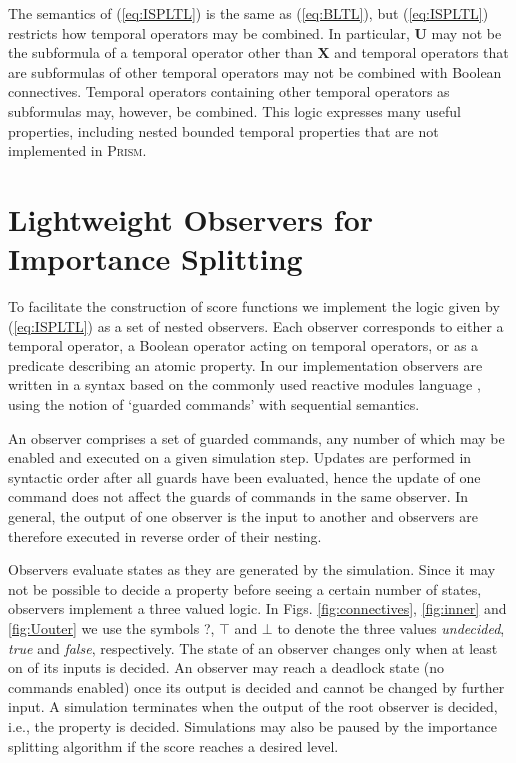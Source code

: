 \documentclass{llncs}
\begin{document}
The semantics of (\ref{eq:ISPLTL}) is the same as (\ref{eq:BLTL}),
but (\ref{eq:ISPLTL}) restricts how temporal operators may be combined.
In particular, $\mathbf{U}$ may not be the subformula of a temporal
operator other than $\mathbf{X}$ and temporal operators that are
subformulas of other temporal operators may not be combined with Boolean
connectives. Temporal operators containing other temporal operators
as subformulas may, however, be combined. This logic expresses many
useful properties, including nested bounded temporal properties that
are not implemented in \textsc{Prism}.


\section{Lightweight Observers for Importance Splitting\label{sec:observers}}

To facilitate the construction of score functions we implement the
logic given by (\ref{eq:ISPLTL}) as a set of nested observers. Each
observer corresponds to either a temporal operator, a Boolean operator
acting on temporal operators, or as a predicate describing an atomic
property. In our implementation observers are written in a syntax
based on the commonly used reactive modules language \cite{AlurHenzinger1999},
using the notion of `guarded commands' \cite{Dijkstra1975} with
sequential semantics.

An observer comprises a set of guarded commands, any number of which
may be enabled and executed on a given simulation step. Updates are
performed in syntactic order after all guards have been evaluated,
hence the update of one command does not affect the guards of commands
in the same observer. In general, the output of one observer is the
input to another and observers are therefore executed in reverse order
of their nesting.

Observers evaluate states as they are generated by the simulation.
Since it may not be possible to decide a property before seeing a
certain number of states, observers implement a three valued logic.
In Figs. \ref{fig:connectives}, \ref{fig:inner} and \ref{fig:Uouter}
we use the symbols \textsf{?}, $\top$ and $\bot$ to denote the three
values \emph{undecided}, \emph{true} and \emph{false}, respectively.
The state of an observer changes only when at least on of its inputs
is decided. An observer may reach a deadlock state (no commands enabled)
once its output is decided and cannot be changed by further input.
A simulation terminates when the output of the root observer is decided,
i.e., the property is decided. Simulations may also be paused by the
importance splitting algorithm if the score reaches a desired level.
\end{document}

